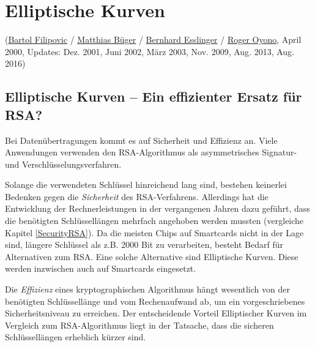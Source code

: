 
\begin{refsegment}

\hypertarget{Chapter_EllipticCurves}{}
\chapter{Elliptische Kurven}
\label{Chapter_EllipticCurves}
(\hyperlink{author_Bartol-Filipovic}{Bartol Filipovic} /
 \hyperlink{author_Matthias-Bueger}{Matthias Büger} /
 \hyperlink{author_Bernhard-Esslinger}{Bernhard Esslinger} /
 \hyperlink{author_Roger-Oyono}{Roger Oyono},
 April 2000,
 Updates: Dez. 2001, Juni 2002, März 2003, Nov. 2009, Aug. 2013, Aug. 2016)

\section{Elliptische Kurven -- Ein effizienter Ersatz für RSA?}
\label{ECAlternative}

Bei Datenübertragungen kommt es auf Sicherheit und Effizienz an.  Viele
Anwendungen verwenden den RSA-Algorithmus als asymmetrisches Signatur- und
Verschlüsselungsverfahren.

Solange die verwendeten Schlüssel hinreichend lang sind, bestehen keinerlei
Bedenken gegen die {\em Sicherheit} des RSA-Verfahrens. Allerdings hat die
Entwicklung der Rechnerleistungen in der vergangenen Jahren dazu geführt,
dass die benötigten Schlüssellängen mehrfach angehoben werden mussten
(vergleiche Kapitel \ref{SecurityRSA}).
Da die meisten Chips auf Smartcards nicht in der Lage sind,
längere Schlüssel als z.B. 2000 Bit zu verarbeiten, besteht Bedarf für
Alternativen zum RSA. Eine solche Alternative sind Elliptische Kurven. Diese
werden inzwischen auch auf Smartcards eingesetzt.

Die {\em Effizienz} eines kryptographischen Algorithmus hängt wesentlich
von der benötigten \linebreak[4]Schlüssellänge und vom Rechenaufwand ab,
um ein vorgeschriebenes Sicherheitsniveau zu erreichen.
Der entscheidende Vorteil Elliptischer Kurven im Vergleich zum
RSA-Algorithmus liegt in der Tatsache, dass die sicheren Schlüssellängen
erheblich kürzer sind.


\end{refsegment}
